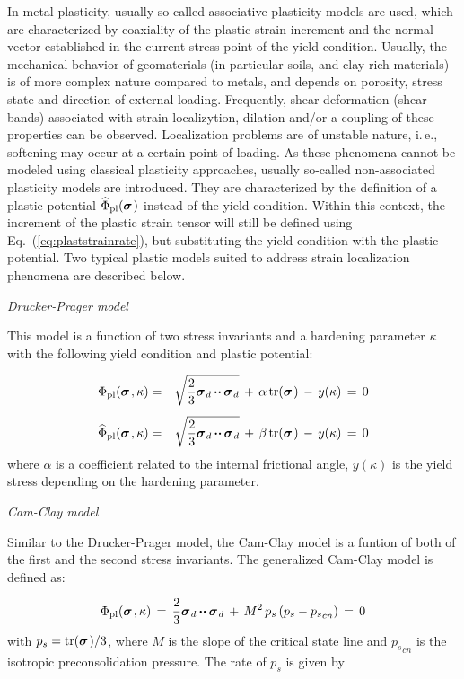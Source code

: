 In metal plasticity, usually so-called associative plasticity models are used, which are characterized by coaxiality of the plastic strain increment and the normal vector established in the current stress point of the yield condition. Usually, the mechanical behavior of geomaterials (in particular soils, and clay-rich materials) is of more complex nature compared to metals, and depends on porosity, stress state and direction of external loading. Frequently, shear deformation (shear bands) associated with strain localizytion, dilation and/or a coupling of these properties can be observed. Localization problems are of unstable nature, i.\,e., softening may occur at a certain point of loading. As these phenomena cannot be modeled using classical plasticity approaches, usually so-called non-associated plasticity models are introduced. They are characterized by the definition of a plastic potential ${\widehat{\Phi}}_{\mathrm{pl}}(\mbox{${\mbox{\boldmath${\sigma}$\unboldmath}}_{\:\!}$})$ instead of the yield condition. Within this context, the increment of the plastic strain tensor will still be defined using Eq.~(\ref{eq:plaststrainrate}), but substituting the yield condition with the plastic potential. Two typical plastic models suited to address strain localization phenomena are described below.

\medskip
{\sl Drucker-Prager model}

This model is a function of two stress invariants and a hardening parameter $\kappa$ with the following yield condition and plastic potential:

\begin{eqnarray}
\Phi_{\mathrm{pl}}(\miu{\sigma}{}{},\kappa) & = &
\sqrt{\ttfrac{2}{3}\miu{\sigma}{d}{}\ccdot\miu{\sigma}{d}{}}\,+\,\alpha\,\mathrm{tr}(\miu{\sigma}{}{})\,-\,y(\kappa)\,=\,0 \\[1.0ex]
{\widehat{\Phi}}_{\mathrm{pl}}(\miu{\sigma}{}{},\kappa) & = &
\sqrt{\ttfrac{2}{3}\miu{\sigma}{d}{}\ccdot\miu{\sigma}{d}{}}\,+\,\beta\,\mathrm{tr}(\miu{\sigma}{}{})\,-\,y(\kappa)\,=\,0
\label{Mp_eqn:dp}
\end{eqnarray}
where $\alpha$ is a coefficient related to the internal frictional angle, $y(\kappa)$ is the yield stress depending on the hardening parameter.


\medskip
{\sl Cam-Clay model}

Similar to the Drucker-Prager model, the Cam-Clay model is a funtion of both of the first and the second stress invariants. The generalized Cam-Clay model is defined as:

\begin{eqnarray}
\Phi_{\mathrm{pl}}(\miu{\sigma}{}{},\kappa)\,=\,
\ttfrac{2}{3}\miu{\sigma}{d}{}\ccdot\miu{\sigma}{d}{}\,+\,M^2\,p_s\,(p_s-{p_s}_{cn})\,=\,0
\label{Mp_eqn:cc}
\end{eqnarray}
with $p_s=\mathrm{tr}(\mbox{${\mbox{\boldmath${\sigma}$\unboldmath}}_{\:\!}$})/3$, where $M$ is the slope of the critical state line and ${p_s}_{cn}$ is the isotropic preconsolidation pressure. The rate of $p_s$ is given by

